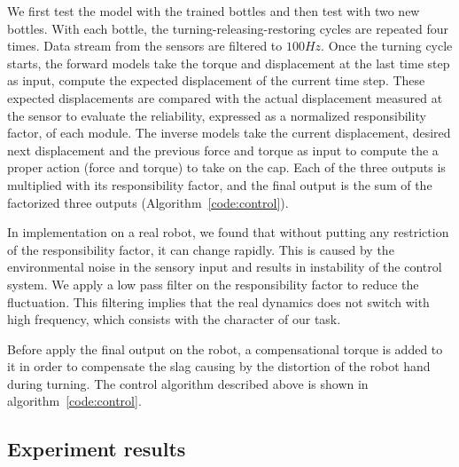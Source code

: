 We first test the model with the trained bottles and then test with two new bottles. With each bottle, the turning-releasing-restoring cycles are repeated four times. Data stream from the sensors are filtered to $100Hz$. Once the turning cycle starts, the forward models take the torque and displacement at the last time step as input, compute the expected displacement of the current time step. These expected displacements are compared with the actual displacement measured at the sensor to evaluate the reliability, expressed as a normalized responsibility factor, of each module. The inverse models take the current displacement, desired next displacement and the previous force and torque as input to compute the a proper action (force and torque) to take on the cap. Each of the three outputs is multiplied with its responsibility factor, and the final output is the sum of the factorized three outputs (Algorithm~\ref{code:control}).

In implementation on a real robot, we found that without putting any restriction of the responsibility factor, it can change rapidly. This is caused by the environmental noise in the sensory input and results in instability of the control system. We apply a low pass filter on the responsibility factor to reduce the fluctuation. This filtering implies that the real dynamics does not switch with high frequency, which consists with the character of our task.


Before apply the final output on the robot, a compensational torque is added to it in order to compensate the slag causing by the distortion of the robot hand during turning. The control algorithm described above is shown in algorithm~\ref{code:control}.



\subsection{Experiment results}
\label{cha4:sec3:result}


